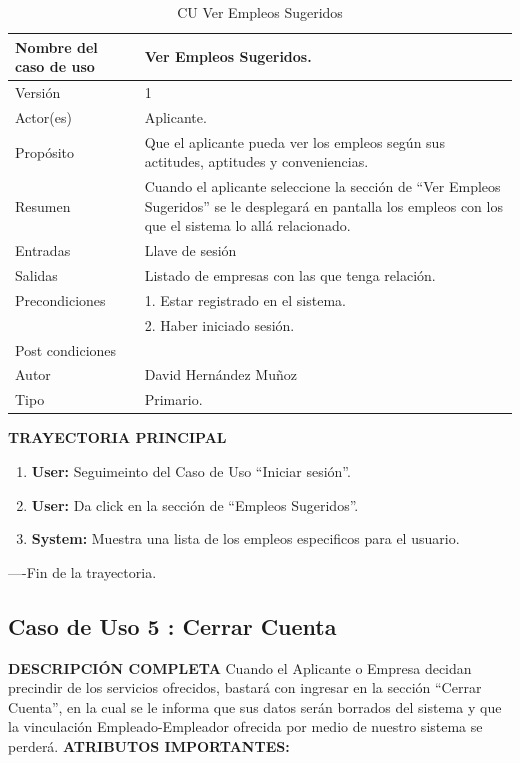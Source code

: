 \begin{table}[h]			
        \begin{center}			
\begin{tabular}{|l|p{11cm}|} \hline			
Nombre del caso de uso	&	Ver Empleos Sugeridos.	\\ \hline
Versión	&	1	\\ \hline
Actor(es)	&	Aplicante.	\\ \hline
Propósito	&	Que el aplicante pueda ver los empleos según sus actitudes, aptitudes y conveniencias.	\\ \hline
Resumen	&	Cuando el aplicante seleccione la sección de “Ver Empleos Sugeridos” se le desplegará en pantalla los empleos con los que el sistema lo allá relacionado.	\\ \hline
Entradas	&	Llave de sesión	\\ \hline
			
			
			
			
Salidas	&	Listado de empresas con las que tenga relación.	\\ \hline
Precondiciones	&	1. Estar registrado en el sistema.\\
&2. Haber iniciado sesión.
	\\ \hline
Post condiciones	&		\\ \hline
Autor	&	David Hernández Muñoz	\\ \hline
Tipo	&	Primario.	\\ \hline
\end{tabular}			
        \caption	{	CU Ver Empleos Sugeridos	}
        \label	{tabla	4	}
        \end{center}			
\end{table}			


\textbf{TRAYECTORIA PRINCIPAL}			
\begin{enumerate}			
\item \textbf{	User: 	}	Seguimeinto del Caso de Uso “Iniciar  sesión”.
\item \textbf{	User: 	}	Da click en la sección de “Empleos Sugeridos”.
\item \textbf{	System: 	}	Muestra una lista de los empleos especificos para el usuario.
			
\end{enumerate}			
----Fin de la trayectoria.			




\newpage			
\subsection{Caso de Uso 	5	: Cerrar Cuenta	}
		\textbf{DESCRIPCIÓN COMPLETA}	
		\newline 	
		Cuando el Aplicante o Empresa decidan precindir de los servicios ofrecidos, bastará con ingresar en la sección “Cerrar Cuenta”, en la cual se le informa que sus datos serán borrados del sistema y que la vinculación Empleado-Empleador ofrecida por medio de nuestro sistema se perderá.	
\newline	\newline	\textbf{ATRIBUTOS IMPORTANTES:}	

